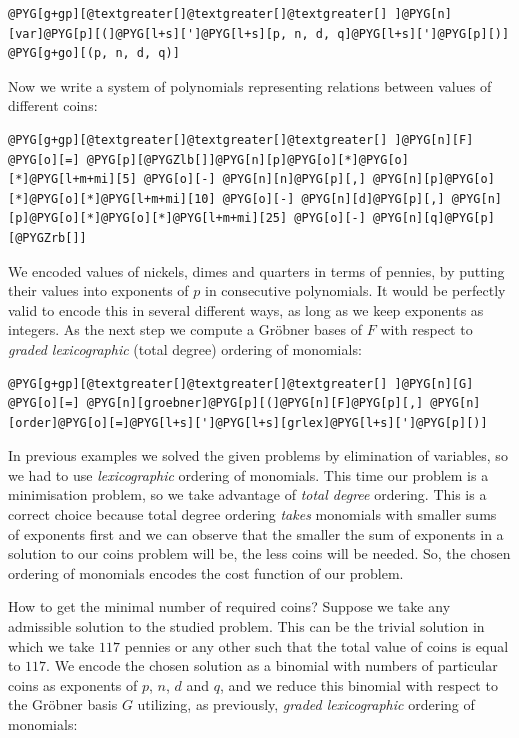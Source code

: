 \begin{Verbatim}[commandchars=@\[\]]
@PYG[g+gp][@textgreater[]@textgreater[]@textgreater[] ]@PYG[n][var]@PYG[p][(]@PYG[l+s][']@PYG[l+s][p, n, d, q]@PYG[l+s][']@PYG[p][)]
@PYG[g+go][(p, n, d, q)]
\end{Verbatim}
\noindent
Now we write a system of polynomials representing relations between values of different coins:

\begin{Verbatim}[commandchars=@\[\]]
@PYG[g+gp][@textgreater[]@textgreater[]@textgreater[] ]@PYG[n][F] @PYG[o][=] @PYG[p][@PYGZlb[]]@PYG[n][p]@PYG[o][*]@PYG[o][*]@PYG[l+m+mi][5] @PYG[o][-] @PYG[n][n]@PYG[p][,] @PYG[n][p]@PYG[o][*]@PYG[o][*]@PYG[l+m+mi][10] @PYG[o][-] @PYG[n][d]@PYG[p][,] @PYG[n][p]@PYG[o][*]@PYG[o][*]@PYG[l+m+mi][25] @PYG[o][-] @PYG[n][q]@PYG[p][@PYGZrb[]]
\end{Verbatim}
\noindent
We encoded values of nickels, dimes and quarters in terms of pennies, by putting their values into
exponents of $p$ in consecutive polynomials. It would be perfectly valid to encode this in several
different ways, as long as we keep exponents as integers. As the next step we compute a Gröbner
bases of $F$ with respect to \emph{graded lexicographic} (total degree) ordering of monomials:

\begin{Verbatim}[commandchars=@\[\]]
@PYG[g+gp][@textgreater[]@textgreater[]@textgreater[] ]@PYG[n][G] @PYG[o][=] @PYG[n][groebner]@PYG[p][(]@PYG[n][F]@PYG[p][,] @PYG[n][order]@PYG[o][=]@PYG[l+s][']@PYG[l+s][grlex]@PYG[l+s][']@PYG[p][)]
\end{Verbatim}
\noindent
In previous examples we solved the given problems by elimination of variables, so we had to use
\emph{lexicographic} ordering of monomials. This time our problem is a minimisation problem, so we take
advantage of \emph{total degree} ordering. This is a correct choice because total degree ordering \emph{takes}
monomials with smaller sums of exponents first and we can observe that the smaller the sum of exponents
in a solution to our coins problem will be, the less coins will be needed. So, the chosen ordering of
monomials encodes the cost function of our problem.

How to get the minimal number of required coins? Suppose we take any admissible solution to the studied
problem. This can be the trivial solution in which we take $117$ pennies or any other such that the
total value of coins is equal to $117$. We encode the chosen solution as a binomial with numbers of
particular coins as exponents of $p$, $n$, $d$ and $q$, and we reduce this binomial with respect to
the Gröbner basis $G$ utilizing, as previously, \emph{graded lexicographic} ordering of monomials:

